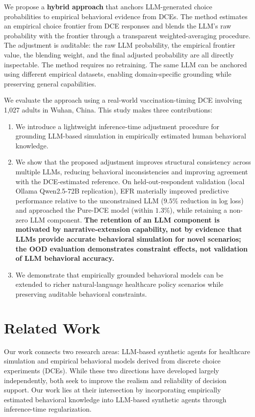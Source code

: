 \documentclass[12pt]{article}
\begin{document}
We propose a \textbf{hybrid approach} that anchors LLM-generated choice probabilities to empirical behavioral evidence from DCEs. The method estimates an empirical choice frontier from DCE responses and blends the LLM's raw probability with the frontier through a transparent weighted-averaging procedure. The adjustment is auditable: the raw LLM probability, the empirical frontier value, the blending weight, and the final adjusted probability are all directly inspectable. The method requires no retraining. The same LLM can be anchored using different empirical datasets, enabling domain-specific grounding while preserving general capabilities.

We evaluate the approach using a real-world vaccination-timing DCE involving 1,027 adults in Wuhan, China. This study makes three contributions:

\begin{enumerate}
    \item We introduce a lightweight inference-time adjustment procedure for grounding LLM-based simulation in empirically estimated human behavioral knowledge.

    \item We show that the proposed adjustment improves structural consistency across multiple LLMs, reducing behavioral inconsistencies and improving agreement with the DCE-estimated reference. On held-out-respondent validation (local Ollama Qwen2.5-72B replication), EFR materially improved predictive performance relative to the unconstrained LLM ($9.5\%$ reduction in log loss) and approached the Pure-DCE model (within $1.3\%$), while retaining a non-zero LLM component. \textbf{The retention of an LLM component is motivated by narrative-extension capability, not by evidence that LLMs provide accurate behavioral simulation for novel scenarios; the OOD evaluation demonstrates constraint effects, not validation of LLM behavioral accuracy.}

    \item We demonstrate that empirically grounded behavioral models can be extended to richer natural-language healthcare policy scenarios while preserving auditable behavioral constraints.
\end{enumerate}\section{Related Work}

Our work connects two research areas: LLM-based synthetic agents for healthcare simulation and empirical behavioral models derived from discrete choice experiments (DCEs). While these two directions have developed largely independently, both seek to improve the realism and reliability of decision support. Our work lies at their intersection by incorporating empirically estimated behavioral knowledge into LLM-based synthetic agents through inference-time regularization.
\end{document}
